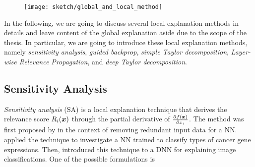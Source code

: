  \begin{figure}
\centering
\texttt{[image: sketch/global\_and\_local\_method]}
\label{fig:comparision_between_global_and_local_analysis}
\end{figure}

In the following, we are going to discuss several local explanation methods in details and leave content of the global explanation aside due to the scope of the thesis. In particular, we are going to introduce these local explanation methods, namely \textit{sensitivity analysis}, \textit{guided backprop}, \textit{simple Taylor decomposition}, \textit{Layer-wise Relevance Propagation}, and \textit{deep Taylor decomposition}.


%

\subsection{Sensitivity Analysis}
\textit{Sensitivity analysis} (SA) is a local explanation technique that derives the relevance score $R_i(\boldsymbol{x})$ through the  partial derivative of $\frac{\partial f(\patvector{x})}{ \partial x_i }$.  The method was first proposed by \citet{ZuradaSensitivityAnalysisMinimization1994} in the context of removing redundant input data for a NN. \citet{KhanClassificationdiagnosticprediction2001} applied the technique to investigate a NN trained to classify types of cancer gene expressions. Then, \citet{SimonyanDeepConvolutionalNetworks2013} introduced this technique to a DNN for explaining image classifications. One of the possible formulations is 

